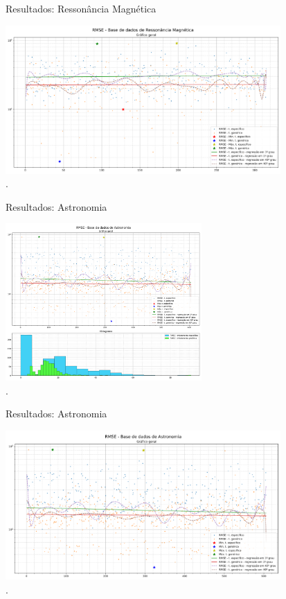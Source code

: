 \documentclass{beamer}
\begin{document}
    \begin{frame}{Resultados: Ressonância Magnética}{\thesection \, \secname}

        \centering
        \includegraphics[width=10.5cm]{img/resultados/rmse_mri_cropped.png} \\
        .

    \end{frame}

    \begin{frame}{Resultados: Astronomia}{\thesection \, \secname}
        
        \centering
        \includegraphics[width=7.5cm]{img/resultados/rmse_astronomy_compound.png} \\
        .

    \end{frame}

    \begin{frame}{Resultados: Astronomia}{\thesection \, \secname}
        
        \centering
        \includegraphics[width=10.5cm]{img/resultados/rmse_astronomy_cropped.png} \\
        .

    \end{frame}
\end{document}
